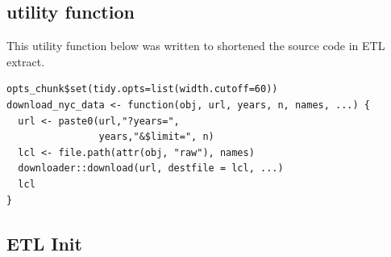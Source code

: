 \documentclass[12pt,twoside]{reedthesis}
\theoremstyle{definition}
\theoremstyle{definition}
\theoremstyle{definition}
\theoremstyle{remark}
\begin{document}
\subsection{utility function}\label{utility-function}

This utility function below was written to shortened the source code in
ETL extract.
\begin{verbatim}
opts_chunk$set(tidy.opts=list(width.cutoff=60))
download_nyc_data <- function(obj, url, years, n, names, ...) {
  url <- paste0(url,"?years=",
                years,"&$limit=", n)
  lcl <- file.path(attr(obj, "raw"), names)
  downloader::download(url, destfile = lcl, ...)
  lcl
}
\end{verbatim}
\subsection{ETL Init}\label{etl-init}
\end{document}
